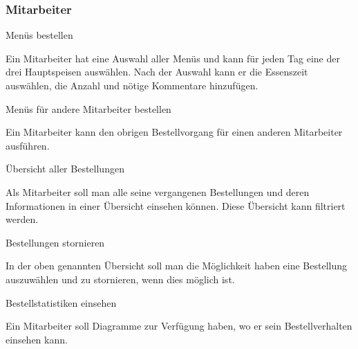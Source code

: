\subsubsection{Mitarbeiter}

\begin{compactitem}
    \item Menüs bestellen
    \begin{compactitem}
        \item Ein Mitarbeiter hat eine Auswahl aller Menüs und kann für jeden Tag eine der drei Hauptspeisen auswählen. Nach der Auswahl kann er die Essenszeit auswählen, die Anzahl und nötige Kommentare hinzufügen.
    \end{compactitem}
    \item Menüs für andere Mitarbeiter bestellen
    \begin{compactitem}
        \item Ein Mitarbeiter kann den obrigen Bestellvorgang für einen anderen Mitarbeiter ausführen. 
    \end{compactitem}
    \item Übersicht aller Bestellungen
    \begin{compactitem}
        \item Als Mitarbeiter soll man alle seine vergangenen Bestellungen und deren Informationen in einer Übersicht einsehen können. Diese Übersicht kann filtriert werden.
    \end{compactitem}
    \item Bestellungen stornieren
    \begin{compactitem}
        \item In der oben genannten Übersicht soll man die Möglichkeit haben eine Bestellung auszuwählen und zu stornieren, wenn dies möglich ist.
    \end{compactitem}
    \item Bestellstatistiken einsehen
    \begin{compactitem}
        \item Ein Mitarbeiter soll Diagramme zur Verfügung haben, wo er sein Bestellverhalten einsehen kann.
    \end{compactitem}
\end{compactitem}

